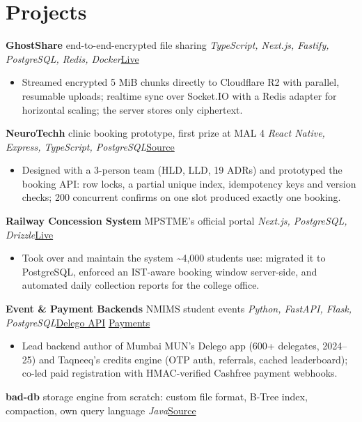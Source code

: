\documentclass[10pt, a4paper]{article}
\newcommand{\proj}[4]{\par\vspace{2.5pt}\textbf{#1} \textbar{} #2 \textbar{} \textit{\small #3}\hfill{\small #4}\par}
\newcommand{\lnk}[2]{\href{#1}{\color{linkc}#2}}
\begin{document}
\section{Projects}
\proj{GhostShare}{end-to-end-encrypted file sharing}{TypeScript, Next.js, Fastify, PostgreSQL, Redis, Docker}{\lnk{https://share.jkartik.in}{Live}}
\begin{itemize}
  \item Streamed encrypted 5 MiB chunks directly to Cloudflare R2 with parallel, resumable uploads; realtime sync over Socket.IO with a
  Redis adapter for horizontal scaling; the server stores only ciphertext.
\end{itemize}
\proj{NeuroTechh}{clinic booking prototype, first prize at MAL 4}{React Native, Express, TypeScript, PostgreSQL}{\lnk{https://github.com/KartikJain14/mal-hackathon}{Source}}
\begin{itemize}
  \item Designed with a 3-person team (HLD, LLD, 19 ADRs) and prototyped the booking API: row locks, a partial unique index,
  idempotency keys and version checks; 200 concurrent confirms on one slot produced exactly one booking.
\end{itemize}
\proj{Railway Concession System}{MPSTME's official portal}{Next.js, PostgreSQL, Drizzle}{\lnk{https://concession.mpst.me}{Live}}
\begin{itemize}
  \item Took over and maintain the system \textasciitilde{}4,000 students use: migrated it to PostgreSQL, enforced an
  IST-aware booking window server-side, and automated daily collection reports for the college office.
\end{itemize}
\proj{Event \& Payment Backends}{NMIMS student events}{Python, FastAPI, Flask, PostgreSQL}{\lnk{https://github.com/munsoc-mpstme/mundra}{Delego API}\,\textbar\,\lnk{https://github.com/MPSTME-ACM/pfe-regi}{Payments}}
\begin{itemize}
  \item Lead backend author of Mumbai MUN's Delego app (600+ delegates, 2024--25) and Taqneeq's credits engine (OTP
  auth, referrals, cached leaderboard); co-led paid registration with HMAC-verified Cashfree payment webhooks.
\end{itemize}
\par\vspace{2.5pt}\textbf{bad-db} \textbar{} storage engine from scratch: custom file format, B-Tree index, compaction, own query language \textbar{} \textit{\small Java}\hfill{\small\lnk{https://github.com/KartikJain14/bad-db}{Source}}\par
\end{document}

